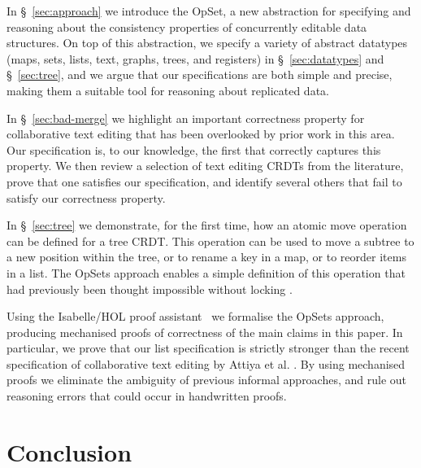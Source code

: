 \documentclass[11pt]{article}
\begin{document}
\begin{itemize*}
\item In \S~\ref{sec:approach} we introduce the OpSet, a new abstraction for specifying and reasoning about the consistency properties of concurrently editable data structures.
On top of this abstraction, we specify a variety of abstract datatypes (maps, sets, lists, text, graphs, trees, and registers) in \S~\ref{sec:datatypes} and \S~\ref{sec:tree}, and we argue that our specifications are both simple and precise, making them a suitable tool for reasoning about replicated data.

\item In \S~\ref{sec:bad-merge} we highlight an important correctness property for collaborative text editing that has been overlooked by prior work in this area.
Our specification is, to our knowledge, the first that correctly captures this property.
We then review a selection of text editing CRDTs from the literature, prove that one satisfies our specification, and identify several others that fail to satisfy our correctness property.

\item In \S~\ref{sec:tree} we demonstrate, for the first time, how an atomic move operation can be defined for a tree CRDT.
This operation can be used to move a subtree to a new position within the tree, or to rename a key in a map, or to reorder items in a list.
The OpSets approach enables a simple definition of this operation that had previously been thought impossible without locking \cite{Najafzadeh:2017vk}.

\item Using the Isabelle/HOL proof assistant~\cite{DBLP:conf/tphol/WenzelPN08} we formalise the OpSets approach, producing mechanised proofs of correctness of the main claims in this paper.
In particular, we prove that our list specification is strictly stronger than the recent specification of collaborative text editing by Attiya et al. \cite{Attiya:2016kh}.
By using mechanised proofs we eliminate the ambiguity of previous informal approaches, and rule out reasoning errors that could occur in handwritten proofs.
\end{itemize*}







\section{Conclusion}
\end{document}
